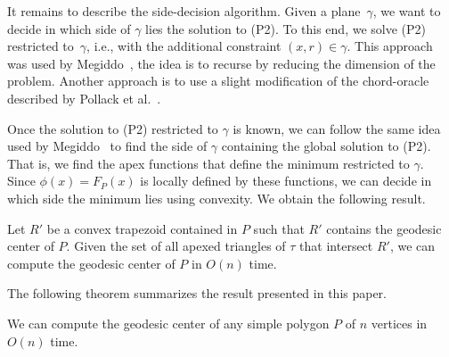 \documentclass[a4paper,UKenglish]{lipics}
\newcommand{\F}[2]{\ensuremath{F_{\scriptscriptstyle #1}(#2)}}
\newcommand{\reg}{\ensuremath{R'}}
\begin{document}
It remains to describe the side-decision algorithm. 
Given a plane~$\gamma$, we want to decide in which side of $\gamma$ lies the solution to (P2).
To this end, we solve (P2) restricted to~$\gamma$, i.e., with the additional constraint $(x,r)\in \gamma$. 
This approach was used by Megiddo~\cite{megiddo1989ball}, the idea is to recurse by reducing the dimension of the problem.
Another approach is to use a slight modification of the chord-oracle described by Pollack et al.~\cite[Section~3]{pollackComputingCenter}. 

Once the solution to (P2) restricted to $\gamma$ is known, we can follow the same idea used by Megiddo~\cite{megiddo1989ball} to find the side of $\gamma$ containing the global solution to (P2). 
That is, we find the apex functions that define the minimum restricted to $\gamma$. 
Since $\phi(x) = \F{P}{x}$ is locally defined by these functions, 
we can decide in which side the minimum lies using convexity.
We obtain the following result.

\begin{lemma}
Let $\reg$ be a convex trapezoid contained in $P$ such that $\reg$ contains the geodesic center of $P$. 
Given the set of all apexed triangles of $\tau$ that intersect $\reg$, 
we can compute the geodesic center of $P$ in $O(n)$ time.
\end{lemma}

The following theorem summarizes the result presented in this paper.

\begin{theorem}
We can compute the geodesic center of any simple polygon $P$ of $n$ vertices in $O(n)$ time.
\end{theorem}




\end{document}
